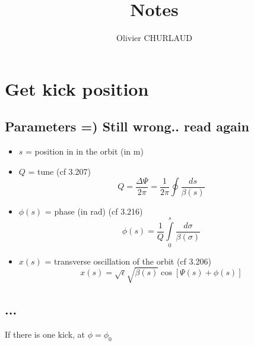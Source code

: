 \documentclass[12pt,a4paper]{article}
\author{Olivier CHURLAUD}
\title{Notes}
\begin{document}
	\maketitle
	
	\section{Get kick position}
	
	\subsection{Parameters =) Still wrong.. read again}
	\begin{itemize}
		\item $s$ = position in in the orbit (in m)
		\item $Q$ = tune (cf 3.207)
		\begin{equation}
			Q = \frac{\Delta \Psi}{2 \pi}= \frac{1}{2 \pi} \oint \frac{ds}{\beta(s)}
		\end{equation}
		
		\item $\phi(s)$ = phase (in rad)  (cf 3.216)
		\begin{equation}
			\phi(s) = \frac{1}{Q} \int\limits_{0}^s \frac{d\sigma}{\beta(\sigma)}
		\end{equation}
		
		\item $x(s)$ = transverse oscillation of the orbit (cf 3.206) 
		\begin{equation}
			x(s) = \sqrt{\epsilon}\sqrt{\beta(s)}\cos[\Psi(s)+\phi(s)]
		\end{equation}
	\end{itemize}
	
	\subsection{...}
	If there is one kick, at $\phi = \phi_0$
\end{document}
